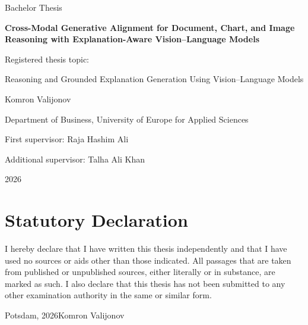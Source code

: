 \documentclass[12pt,bibliography=totoc,listof=totoc,BCOR=5mm,DIV=12,oneside,open=any]{scrbook}
\author{Komron Valijonov}
\begin{document}
\frontmatter
    \begin{titlepage}
        \centering
        \vspace*{2cm}
        {\Large Bachelor Thesis\par}
        \vspace{1.5cm}
        {\huge\bfseries Cross-Modal Generative Alignment for Document, Chart, and Image Reasoning with Explanation-Aware Vision--Language Models\par}
        \vspace{1.2cm}
        {\large Registered thesis topic:\par}
        \vspace{0.2cm}
        {\Large Reasoning and Grounded Explanation Generation Using Vision--Language Models\par}
        \vspace{2cm}
        {\Large Komron Valijonov\par}
        \vspace{0.5cm}
        {\large Department of Business, University of Europe for Applied Sciences\par}
        \vfill
        {\large First supervisor: Raja Hashim Ali\par}
        {\large Additional supervisor: Talha Ali Khan\par}
        \vspace{1cm}
        {\large 2026\par}
    \end{titlepage}
    \thispagestyle{empty}
    \clearpage

    \chapter*{Statutory Declaration}
    I hereby declare that I have written this thesis independently and that I have used no sources or aids other than those indicated.
    All passages that are taken from published or unpublished sources, either literally or in substance, are marked as such.
    I also declare that this thesis has not been submitted to any other examination authority in the same or similar form.

    \vspace{2cm}
    \noindent Potsdam, 2026\hfill Komron Valijonov
    \clearpage
\end{document}
